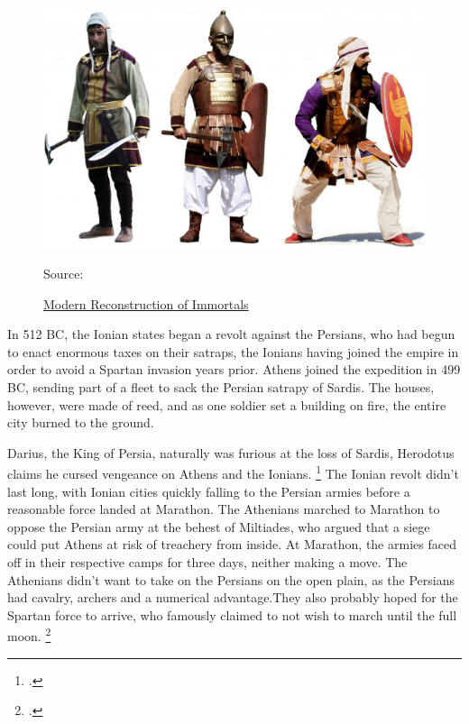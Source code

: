 \documentclass[twoside, a4paper, 12pt]{article}
\newcommand{\sourceR}[1]{\caption*{\hfill Source: {#1}} }
\begin{document}
\begin{figure}
  \centering
  \includegraphics[width=\linewidth]{ModernImmortalReco.jpg}
  \captionsetup{justification=raggedleft}
  \caption{\ul{Modern Reconstruction of Immortals}}
  \sourceR{\cite{farrokh_2013}}
  \label{img:ImmortalModern}
\end{figure}

\par\vspace{1em}

In 512 BC, the Ionian states began a revolt against the Persians, who had
begun to enact enormous taxes on their satraps, the Ionians having joined the
empire in order to avoid a Spartan invasion years prior.\footnotemark
Athens joined the expedition in 499 BC, sending part of a fleet to sack the Persian
satrapy of Sardis. The houses, however, were made of reed, and as one soldier
set a building on fire, the entire city burned to the ground.\footnotemark[\value{footnote}]

\par\vspace{1em}

Darius, the King of Persia, naturally was furious at the loss of Sardis,
Herodotus claims he cursed vengeance on Athens and the Ionians.
\footcite[Book 5.105]{herodotus_1920}
The Ionian revolt didn't last long, with Ionian cities quickly falling to the
Persian armies before a reasonable force landed at Marathon.
\footnotemark
The Athenians marched to Marathon to oppose the Persian army
at the behest of Miltiades, who argued that a siege could put Athens at risk of
treachery from inside. At Marathon, the armies faced off in their
respective camps for three days, neither making a move. The Athenians didn't
want to take on the Persians on the open plain, as the Persians had cavalry,
archers and a numerical advantage.\footnotemark[\value{footnote}]
They also probably hoped for the Spartan force to arrive, who famously claimed
to not wish to march until the full moon.
\footcite[Book 6.106]{herodotus_1920}
\end{document}
